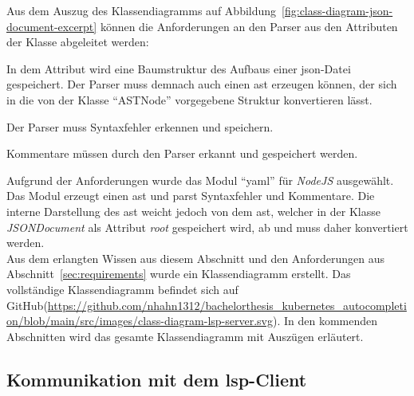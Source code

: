 Aus dem Auszug des Klassendiagramms auf Abbildung~\ref{fig:class-diagram-json-document-excerpt} können die Anforderungen an
den Parser aus den Attributen der Klasse abgeleitet werden:
\begin{description}
  \setlength\itemsep{-0.5cm}
  \item[root]
        In dem Attribut wird eine Baumstruktur des Aufbaus einer \ac{json}-Datei gespeichert. Der Parser muss demnach auch einen \ac{ast} erzeugen können,
        der sich in die von der Klasse ``ASTNode'' vorgegebene Struktur konvertieren lässt.
  \item[syntaxErrors] Der Parser muss Syntaxfehler erkennen und speichern.
  \item[comments] Kommentare müssen durch den Parser erkannt und gespeichert werden.
\end{description}

Aufgrund der Anforderungen wurde das Modul ``yaml'' für \textit{NodeJS} ausgewählt. Das Modul erzeugt einen \ac{ast} und parst Syntaxfehler und Kommentare.
Die interne Darstellung des \ac{ast} weicht jedoch von dem \ac{ast}, welcher in der Klasse \textit{JSONDocument} als Attribut \textit{root}
gespeichert wird, ab und muss daher konvertiert werden.
\\
Aus dem erlangten Wissen aus diesem Abschnitt und den Anforderungen aus Abschnitt~\ref{sec:requirements} wurde ein Klassendiagramm erstellt.
Das vollständige Klassendiagramm befindet sich auf GitHub(\url{https://github.com/nhahn1312/bachelorthesis_kubernetes_autocompletion/blob/main/src/images/class-diagram-lsp-server.svg}).
In den kommenden Abschnitten wird das gesamte Klassendiagramm mit Auszügen erläutert.

\subsection{Kommunikation mit dem \acs{lsp}-Client}\label{sec:lsp-client-communication}

